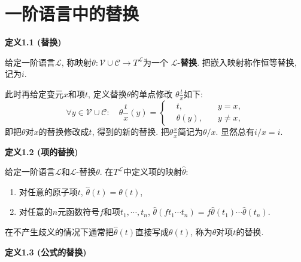 \documentclass[UTF8]{ctexart}
\begin{document}
\setlength{\abovedisplayskip}{1pt}
\setlength{\belowdisplayskip}{1pt}

\section{一阶语言中的替换}

\hypertarget{sec:定义1.1}{}
\noindent\textbf{定义1.1 (替换)}

给定一阶语言$\mathcal{L}$,
称映射$\theta:\mathcal{V}\cup\mathcal{C}\to T^{\mathcal{L}}$为一个
$\mathcal{L}$-\textbf{替换}. 把嵌入映射称作恒等替换, 记为$i$.

\vspace{10pt}

此时再给定变元$x$和项$t$, 定义替换$\theta$的单点修改
$\displaystyle\theta\frac{t}{x}$如下:
\[\forall y\in\mathcal{V}\cup\mathcal{C}:\quad\theta\frac{t}{x}(y)=
\left\{\begin{aligned}
    &t,\quad&y=x,\\[-3pt]
    &\theta(y),\quad&y\neq x,
\end{aligned}\right.\]
即把$\theta$对$x$的替换修改成$t$, 得到的新的替换.
把$\displaystyle\theta\frac{x}{x}$简记为$\theta/x$. 显然总有$i/x=i$.

\vspace{10pt}

\hypertarget{sec:定义1.2}{}
\noindent\textbf{定义1.2 (项的替换)}

给定一阶语言$\mathcal{L}$和$\mathcal{L}$-替换$\theta$.
在$T^{\mathcal{L}}$中定义项的映射$\widehat{\theta}$:
\begin{enumerate}
    \item 对任意的原子项$t$, $\widehat{\theta}(t)=\theta(t)$,
    \item 对任意的$n$元函数符号$f$和项$t_1,\cdots,t_n$,
    $\widehat{\theta}(ft_1\cdots t_n)=f\widehat{\theta}(t_1)\cdots
    \widehat{\theta}(t_n)$.
\end{enumerate}
在不产生歧义的情况下通常把$\widehat{\theta}(t)$直接写成$\theta(t)$, 称为$\theta$对项$t$的替换.

\vspace{10pt}

\hypertarget{sec:定义1.3}{}
\noindent\textbf{定义1.3 (公式的替换)}
\end{document}
